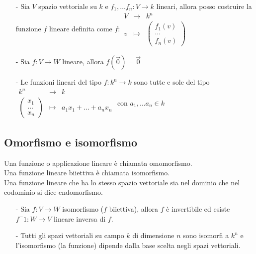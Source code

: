 \documentclass[a4paper]{article}
\newcommand\f[4]{\begin{smallmatrix} {#1} &\to &{#2} \\ {#3} &\mapsto &{#4} \end{smallmatrix}}
\newcommand\psmatrix[3]{\left( \begin{smallmatrix} {#1} \\ {#2} \\ {#3} \end{smallmatrix} \right)}
\begin{document}
\begin{itemize}
	\item[-] Sia \(V\) spazio vettoriale su \(k\) e \(f_1, \dots f_n : V \to k\) lineari, allora posso costruire la funzione
	\(f\) lineare definita come \(f: \f{V}{k^n}{v}{\psmatrix{f_1(v)}{\dots}{f_n(v)}}\)

	\item[-] Sia \(f: V \to W\) lineare, allora \(f(\vec{0}) = \vec{0}\)
	
	\item[-] Le funzioni lineari del tipo \(f: k^n \to k\) sono tutte e sole del tipo \(\f{k^n}{k}{\psmatrix{x_1}{\dots}{x_n}}{a_1 x_1 + \dots + a_n x_n}\)
	con \(a_1, \dots a_n \in k\)
\end{itemize}

\subsection{Omorfismo e isomorfismo}
Una funzione o applicazione lineare è chiamata omomorfismo. \\
Una funzione lineare biiettiva è chiamata isomorfismo. \\
Una funzione lineare che ha lo stesso spazio vettoriale sia nel dominio che nel codominio si dice endomorfismo.

\begin{itemize}
	\item[-] Sia \(f: V \to W\) isomorfismo (\(f\) biiettiva), allora \(f\) è invertibile ed esiste \(f^-1: W \to V\) lineare
	inversa di \(f\).

	\item[-] Tutti gli spazi vettoriali su campo \(k\) di dimensione \(n\) sono isomorfi a \(k^n\) e l'isomorfismo (la funzione)
	dipende dalla base scelta negli spazi vettoriali.
\end{itemize}
\end{document}
